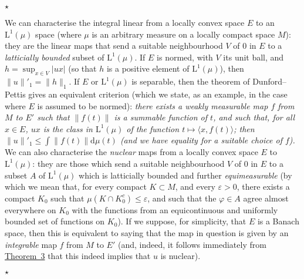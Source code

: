\documentclass{article}
\theoremstyle{plain}
\newcommand{\aster}[1]{$\star${#1}$\star$}
\newcommand{\LL}{\mathrm{L}}
\newcommand{\dd}{\mathrm{d}}
\begin{document}
\aster{
  We can characterise the integral linear from a locally convex space $E$ to an $\LL^1(\mu)$ space (where $\mu$ is an arbitrary measure on a locally compact space $M$): they are the linear maps that send a suitable neighbourhood $V$ of $0$ in $E$ to a \emph{latticially bounded} subset of $\LL^1(\mu)$.
  If $E$ is normed, with $V$ its unit ball, and $h=\sup_{x\in V}|ux|$ (so that $h$ is a positive element of $\LL^1(\mu)$), then $\|u\|'_1=\|h\|_1$.
  If $E$ or $\LL^1(\mu)$ is separable, then the theorem of Dunford--Pettis gives an equivalent criterion (which we state, as an example, in the case where $E$ is assumed to be normed):
  \emph{there exists a weakly measurable map $f$ from $M$ to $E'$ such that $\|f(t)\|$ is a summable function of $t$, and such that, for all $x\in E$, $ux$ is the class in $\LL^1(\mu)$ of the function $t\mapsto\langle x,f(t)\rangle$; then $\|u\|'_1\leq\int\|f(t)\|\dd\mu(t)$ (and we have equality for a suitable choice of $f$).}
  We can also characterise the \emph{nuclear} maps from a locally convex space $E$ to $\LL^1(\mu)$: they are those which send a suitable neighbourhood $V$ of $0$ in $E$ to a subset $A$ of $\LL^1(\mu)$ which is latticially bounded and further \emph{equimeasurable} (by which we mean that, for every compact $K\subset M$, and every $\varepsilon>0$, there exists a compact $K_0$ such that $\mu(K\cap K_0^c)\leq\varepsilon$, and such that the $\varphi\in A$ agree almost everywhere on $K_0$ with the functions from an equicontinuous and uniformly bounded set of functions on $K_0$).
  If we suppose, for simplicity, that $E$ is a Banach space, then this is equivalent to saying that the map in question is given by an \emph{integrable} \cite{2} map $f$ from $M$ to $E'$ (and, indeed, it follows immediately from \hyperref[1.theorem3]{Theorem~3} that this indeed implies that $u$ is nuclear).

}
\end{document}
